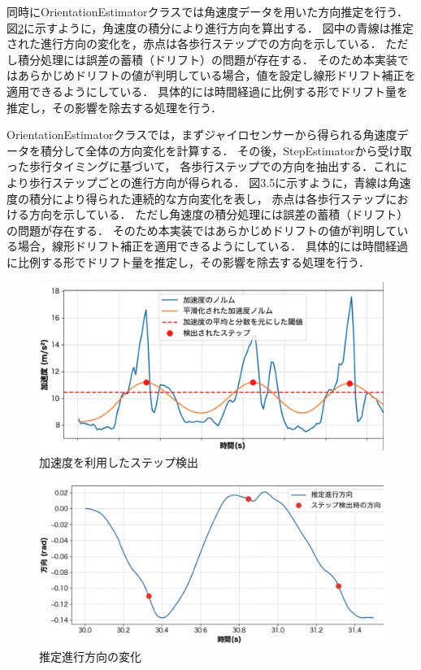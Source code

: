 同時にOrientationEstimatorクラスでは角速度データを用いた方向推定を行う．
図\ref{fig:step_timing}に示すように，角速度の積分により進行方向を算出する．
図中の青線は推定された進行方向の変化を，赤点は各歩行ステップでの方向を示している．
ただし積分処理には誤差の蓄積（ドリフト）の問題が存在する．
そのため本実装ではあらかじめドリフトの値が判明している場合，値を設定し線形ドリフト補正を適用できるようにしている．%
具体的には時間経過に比例する形でドリフト量を推定し，その影響を除去する処理を行う．

OrientationEstimatorクラスでは，まずジャイロセンサーから得られる角速度データを積分して全体の方向変化を計算する．
その後，StepEstimatorから受け取った歩行タイミングに基づいて，
各歩行ステップでの方向を抽出する．これにより歩行ステップごとの進行方向が得られる．
図3.5に示すように，青線は角速度の積分により得られた連続的な方向変化を表し，
赤点は各歩行ステップにおける方向を示している．
ただし角速度の積分処理には誤差の蓄積（ドリフト）の問題が存在する．
そのため本実装ではあらかじめドリフトの値が判明している場合，線形ドリフト補正を適用できるようにしている．
具体的には時間経過に比例する形でドリフト量を推定し，その影響を除去する処理を行う．

\begin{figure}[H]
	\centering
	\includegraphics[width=\linewidth]{../image/step_detect.jpg}
	\caption{加速度を利用したステップ検出}    \label{fig:step_detect}
\end{figure}

\begin{figure}[H]
	\centering
	\includegraphics[width=\linewidth]{../image/step_timing_angle.jpg}
	\caption{推定進行方向の変化}    \label{fig:step_timing}
\end{figure}


